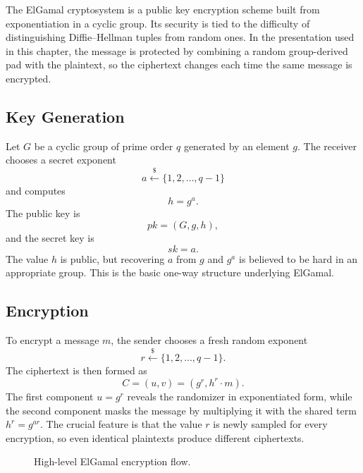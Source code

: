 The ElGamal cryptosystem is a public key encryption scheme built from exponentiation in a cyclic group. Its security is tied to the difficulty of distinguishing Diffie--Hellman tuples from random ones. In the presentation used in this chapter, the message is protected by combining a random group-derived pad with the plaintext, so the ciphertext changes each time the same message is encrypted.

\subsection{Key Generation}

Let $G$ be a cyclic group of prime order $q$ generated by an element $g$. The receiver chooses a secret exponent
\[
a \xleftarrow{\$} \{1,2,\dots,q-1\}
\]
and computes
\[
h = g^a.
\]
The public key is
\[
pk = (G,g,h),
\]
and the secret key is
\[
sk = a.
\]
The value $h$ is public, but recovering $a$ from $g$ and $g^a$ is believed to be hard in an appropriate group. This is the basic one-way structure underlying ElGamal.

\subsection{Encryption}

To encrypt a message $m$, the sender chooses a fresh random exponent
\[
r \xleftarrow{\$} \{1,2,\dots,q-1\}.
\]
The ciphertext is then formed as
\[
C = (u,v) = (g^r, h^r \cdot m).
\]
The first component $u=g^r$ reveals the randomizer in exponentiated form, while the second component masks the message by multiplying it with the shared term $h^r = g^{ar}$. The crucial feature is that the value $r$ is newly sampled for every encryption, so even identical plaintexts produce different ciphertexts.

\begin{figure}[h]
\centering
{}

\vspace{0.4em}

\caption{High-level ElGamal encryption flow.}
\end{figure}

